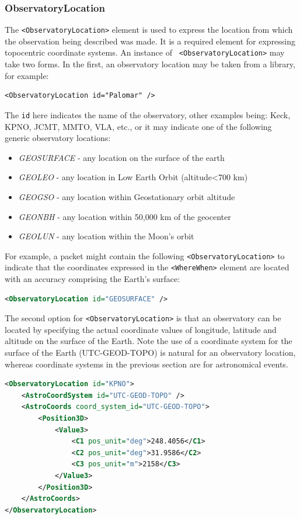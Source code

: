 \documentclass[11pt,a4paper]{ivoa}
\begin{document}
\subsubsection{ObservatoryLocation}
\label{sec:3.4.2}
The {\tt <ObservatoryLocation>} element is used to express the location from 
which the observation being described was made. It is a required element for 
expressing topocentric coordinate systems. An instance of {\tt 
<ObservatoryLocation>} may take two forms. In the first, an observatory location
may be taken from a library, for example: 
{\footnotesize
\begin{verbatim}
<ObservatoryLocation id="Palomar" /> 
\end{verbatim}}
The {\tt id} here indicates the name of the observatory, other examples being: 
Keck, KPNO, JCMT, MMTO, VLA, etc., or it may indicate one of the following 
generic observatory locations: 
\begin{itemize}
\item \emph{GEOSURFACE} - any location on the surface of the earth
\item \emph{GEOLEO} - any location in Low Earth Orbit (altitude<700 km)
\item \emph{GEOGSO} - any location within Geostationary orbit altitude
\item \emph{GEONBH} - any location within 50,000 km of the geocenter
\item \emph{GEOLUN} - any location within the Moon's orbit
\end{itemize}

For example, a packet might contain the following {\tt <ObservatoryLocation>} 
to indicate that the coordinates expressed in the {\tt <WhereWhen>} element are 
located with an accuracy comprising the Earth's surface: 
\begin{lstlisting}[language=XML]
<ObservatoryLocation id="GEOSURFACE" /> 
\end{lstlisting}

The second option for {\tt <ObservatoryLocation>} is that an observatory can be 
located by specifying the actual coordinate values of longitude, latitude and 
altitude on the surface of the Earth. Note the use of a coordinate system for 
the surface of the Earth (UTC-GEOD-TOPO) is natural for an observatory location, 
whereas coordinate systems in the previous section are for astronomical events. 
\begin{lstlisting}[language=XML]
<ObservatoryLocation id="KPNO">
    <AstroCoordSystem id="UTC-GEOD-TOPO" />
    <AstroCoords coord_system_id="UTC-GEOD-TOPO">
        <Position3D>
            <Value3>
                <C1 pos_unit="deg">248.4056</C1>
                <C2 pos_unit="deg">31.9586</C2>
                <C3 pos_unit="m">2158</C3>
            </Value3>
        </Position3D>
    </AstroCoords>
</ObservatoryLocation> 
\end{lstlisting}
\end{document}
